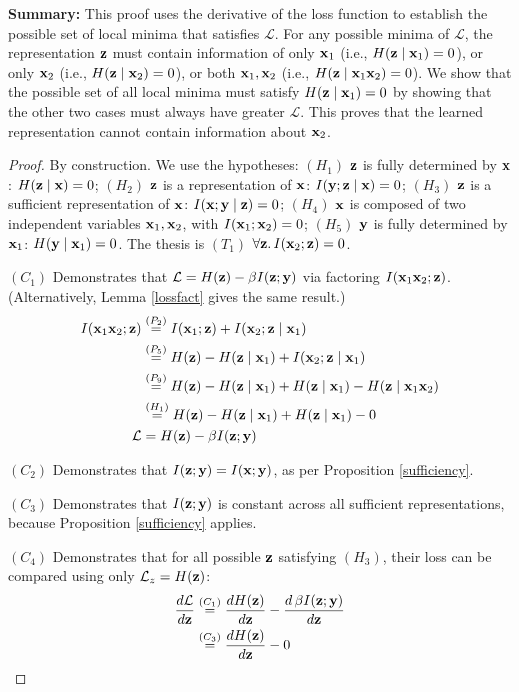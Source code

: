 \textbf{Summary:} This proof uses the derivative of the loss function to establish the possible set of local minima that satisfies $\mathcal{L}$. For any possible minima of $\mathcal{L}$, the representation ${\mathbf{z}}$ must contain information of only ${\mathbf{x}}_1$ (i.e., $H({\mathbf{z}} \mid {\mathbf{x}}_1)=0$), or only ${\mathbf{x}}_2$ (i.e., $H({\mathbf{z}} \mid {\mathbf{x}}_2)=0$), or both ${\mathbf{x}}_1, {\mathbf{x}}_2$ (i.e., $H({\mathbf{z}} \mid {\mathbf{x}}_1 {\mathbf{x}}_2)=0$). We show that the possible set of all local minima must satisfy $H({\mathbf{z}} \mid {\mathbf{x}}_1)=0$ by showing that the other two cases must always have greater $\mathcal{L}$. This proves that the learned representation cannot contain information about ${\mathbf{x}}_2$.

\begin{proof}
By construction. We use the hypotheses: $(H_1)$ ${\mathbf{z}}$ is fully determined by ${\mathbf{x}}$: $H({\mathbf{z}} \mid {\mathbf{x}}) = 0$; $(H_2)$ ${\mathbf{z}}$ is a representation of ${\mathbf{x}}$: $I({\mathbf{y}} ; {\mathbf{z}} \mid {\mathbf{x}})=0$; $(H_3)$ ${\mathbf{z}}$ is a sufficient representation of ${\mathbf{x}}$: $I({\mathbf{x}} ; {\mathbf{y}} \mid {\mathbf{z}})=0$; $(H_4)$ ${\mathbf{x}}$ is composed of two independent variables ${\mathbf{x}}_1, {\mathbf{x}}_2$, with $I({\mathbf{x}}_1; {\mathbf{x}}_2) = 0$; $(H_5)$ ${\mathbf{y}}$ is fully determined by ${\mathbf{x}}_1$: $H({\mathbf{y}} \mid {\mathbf{x}}_1) = 0$. The thesis is $(T_1)$ $\forall {\mathbf{z}}.\, I({\mathbf{x}}_2; {\mathbf{z}}) = 0$.

$(C_1)$ Demonstrates that $\mathcal{L}=H({\mathbf{z}}) -\beta I({\mathbf{z}};{\mathbf{y}})$ via factoring $I({\mathbf{x}}_1 {\mathbf{x}}_2;{\mathbf{z}})$. (Alternatively, Lemma \ref{lossfact} gives the same result.)
\begin{align*} I({\mathbf{x}}_1 {\mathbf{x}}_2; {\mathbf{z}}) &\stackrel{\left(P_2\right)}{=} I({\mathbf{x}}_1; {\mathbf{z}}) + I({\mathbf{x}}_2; {\mathbf{z}} \mid {\mathbf{x}}_1) \\ &\stackrel{\left(P_5\right)}{=} H({\mathbf{z}}) - H({\mathbf{z}} \mid {\mathbf{x}}_1) + I({\mathbf{x}}_2; {\mathbf{z}} \mid {\mathbf{x}}_1) \\ &\stackrel{\left(P_9\right)}{=} H({\mathbf{z}}) - H({\mathbf{z}} \mid {\mathbf{x}}_1) + H({\mathbf{z}} \mid {\mathbf{x}}_1) - H({\mathbf{z}} \mid {\mathbf{x}}_1 {\mathbf{x}}_2) \\ &\stackrel{\left(H_1\right)}{=} H({\mathbf{z}}) - H({\mathbf{z}} \mid {\mathbf{x}}_1) + H({\mathbf{z}} \mid {\mathbf{x}}_1) - 0 \\ \mathcal{L} &= H({\mathbf{z}}) -\beta I({\mathbf{z}}; {\mathbf{y}}) \end{align*}

$(C_2)$ Demonstrates that $I({\mathbf{z}}; {\mathbf{y}}) = I({\mathbf{x}}; {\mathbf{y}})$, as per Proposition \ref{sufficiency}.

$(C_3)$ Demonstrates that $I({\mathbf{z}}; {\mathbf{y}})$ is constant across all sufficient representations, because Proposition \ref{sufficiency} applies.

$(C_4)$ Demonstrates that for all possible ${\mathbf{z}}$ satisfying $(H_3)$, their loss can be compared using only $\mathcal{L}_z = H({\mathbf{z}})$:
\begin{align*} \frac{d\mathcal{L}}{d{\mathbf{z}}} &\stackrel{\left(C_1\right)}{=} \frac{dH({\mathbf{z}})}{d{\mathbf{z}}} - \frac{d\,\beta I({\mathbf{z}}; {\mathbf{y}})}{d{\mathbf{z}}} \\ &\stackrel{\left(C_3\right)}{=} \frac{dH({\mathbf{z}})}{d{\mathbf{z}}} - 0 \end{align*}


\end{proof}
